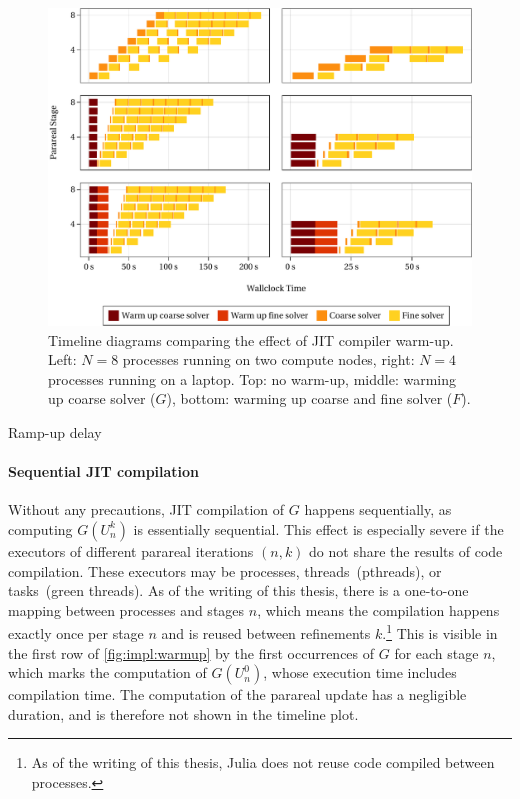 \begin{figure}[tb]
  \includegraphics[width=\textwidth]{figures/fig_impl_warmup2.pdf}
  \caption[Timeline diagrams comparing the effect of JIT compiler warm-up.]{%
    Timeline diagrams comparing the effect of \acs{JIT} compiler warm-up.
    Left: $N=8$ processes running on two compute nodes,
    right: $N=4$ processes running on a laptop.
    Top: no warm-up,
    middle: warming up coarse solver  ($G$),
    bottom: warming up coarse and fine solver  ($F$).
  }
  \label{fig:impl:warmup}
\end{figure}

\begin{table}[tb]
  \caption{Ramp-up delay}
\end{table}

\paragraph{Sequential \ac{JIT} compilation}

Without any precautions,
\ac{JIT} compilation of $G$ happens sequentially,
as computing $G(U_n^k)$ is essentially sequential.
This effect is especially severe if the executors of different parareal iterations $(n,k)$ do not share the results of code compilation.
These executors may be processes, threads~(pthreads), or tasks~(green threads).
As of the writing of this thesis,
there is a one-to-one mapping between processes and stages $n$,
which means the compilation happens exactly once per stage $n$ and is reused between refinements $k$.\footnote{%
  As of the writing of this thesis, Julia does not reuse code compiled between processes.
}
This is visible in the first row of \autoref{fig:impl:warmup}
by the first occurrences of $G$ for each stage $n$,
which marks the computation of $G(U_n^0)$,
whose execution time includes compilation time.
The computation of the parareal update has a negligible duration,
and is therefore not shown in the timeline plot.

